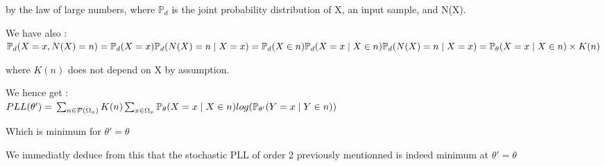 \documentclass[11 pt]{article}
\begin{document}
		by the law of large numbers, where $\mathbb{P}_d$ is the joint probability distribution of X, an input sample, and N(X).

		We have also : $\mathbb{P}_d(X = x, N(X) = n) = \mathbb{P}_d(X = x) \mathbb{P}_d(N(X) = n \mid X = x)  \\
		= \mathbb{P}_d(X \in n)  \mathbb{P}_d(X = x \mid X \in n)  \mathbb{P}_d(N(X) = n \mid X = x)  \\
		=  \mathbb{P}_{\theta}(X = x \mid X \in n) \times K(n)  \\
		$

		where $K(n)$ does not depend on X by assumption.

		We hence get : \\
		$ PLL(\theta')  =  \\
		\sum_{n \in \mathcal{P}(\Omega_x)} K(n) \sum_{x \in \Omega_x} \mathbb{P}_{\theta}(X = x \mid X \in n ) log (\mathbb{P}_{\theta '} (Y=x \mid Y \in n))
$

Which is minimum for $\theta' = \theta$


We immediatly deduce from this that the stochastic PLL of order 2 previously mentionned is indeed minimum at $\theta' = \theta$
\end{document}
